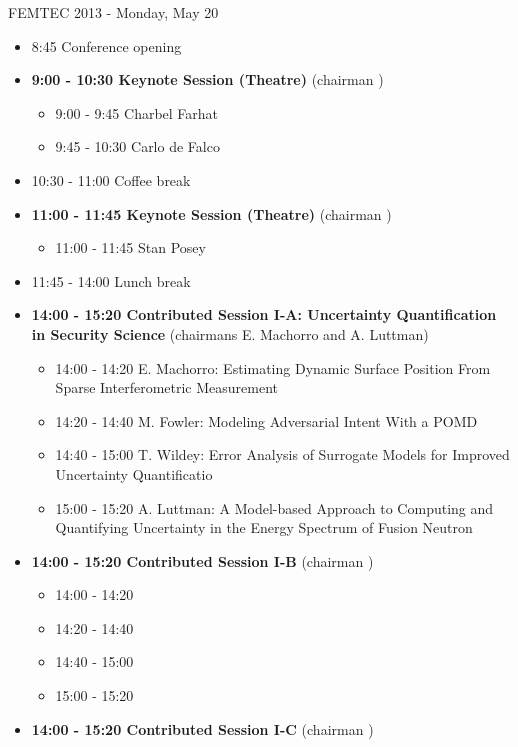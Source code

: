 \documentclass[10pt, A4]{article}%
\begin{document}
\centerline{\huge FEMTEC 2013 - Monday, May 20}
\vspace{4mm}

\begin{itemize}    
  \item 8:45 Conference opening
  \item {\bf 9:00 - 10:30 Keynote Session (Theatre)} (chairman ) 
  \begin{itemize}
    \item 9:00 - 9:45 Charbel Farhat
    \item 9:45 - 10:30 Carlo de Falco
  \end{itemize}
  \item 10:30 - 11:00 Coffee break
  \item {\bf 11:00 - 11:45 Keynote Session (Theatre)} (chairman ) 
  \begin{itemize}
    \item 11:00 - 11:45 Stan Posey
  \end{itemize}
  \item 11:45 - 14:00 Lunch break      
  \item {\bf 14:00 - 15:20 Contributed Session I-A: Uncertainty Quantification in Security Science} (chairmans E. Machorro and A. Luttman) 
  \begin{itemize}
    \item 14:00 - 14:20 {E. Machorro}: {Estimating Dynamic Surface Position From Sparse Interferometric Measurement}
    \item 14:20 - 14:40 {M. Fowler}: {Modeling Adversarial Intent With a POMD}
    \item 14:40 - 15:00 {T. Wildey}: {Error Analysis of Surrogate Models for Improved Uncertainty Quantificatio}
    \item 15:00 - 15:20 {A. Luttman}: {A Model-based Approach to Computing and Quantifying Uncertainty in the Energy Spectrum of Fusion Neutron}
  \end{itemize}
  \item {\bf 14:00 - 15:20 Contributed Session I-B} (chairman ) 
  \begin{itemize}
    \item 14:00 - 14:20 
    \item 14:20 - 14:40 
    \item 14:40 - 15:00 
    \item 15:00 - 15:20 
  \end{itemize}
    \item {\bf 14:00 - 15:20 Contributed Session I-C} (chairman ) 
  \begin{itemize}

\end{itemize}
\end{itemize}
\end{document}
